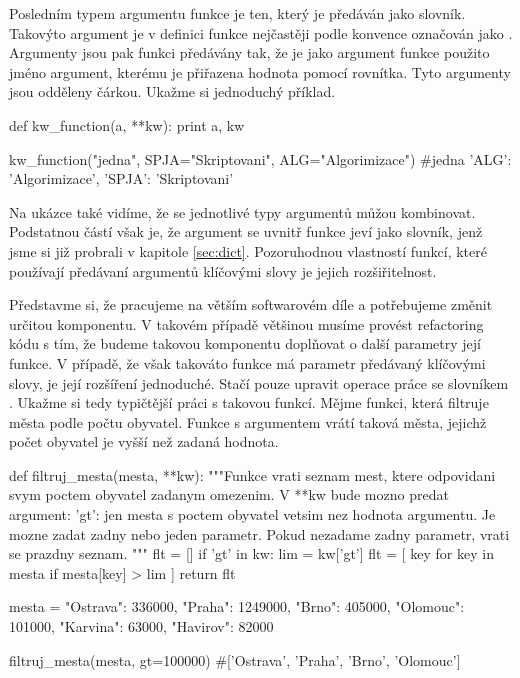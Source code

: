 Posledním typem argumentu funkce je ten, který je předáván jako slovník. Takovýto argument je
v definici funkce nejčastěji podle konvence označován jako . Argumenty jsou pak funkci
předávány tak, že je jako argument funkce použito jméno argument, kterému je přiřazena hodnota pomocí rovnítka.
Tyto argumenty jsou odděleny čárkou. Ukažme si jednoduchý příklad.

\begin{python}
def kw_function(a, **kw):
    print a, kw

kw_function("jedna", SPJA="Skriptovani", ALG="Algorimizace")
#jedna {'ALG': 'Algorimizace', 'SPJA': 'Skriptovani'}
\end{python}

Na ukázce také vidíme, že se jednotlivé typy argumentů můžou kombinovat. Podstatnou částí však je,
že argument  se uvnitř funkce jeví jako slovník, jenž jsme si již probrali v kapitole
\ref{sec:dict}. Pozoruhodnou vlastností funkcí, které používají předávaní argumentů klíčovými
slovy je jejich rozšiřitelnost.

Představme si, že pracujeme na větším softwarovém díle a potřebujeme změnit určitou
komponentu. V takovém případě většinou musíme provést refactoring kódu s tím, že budeme takovou
komponentu doplňovat o další parametry její funkce. V případě, že však takováto funkce má parametr
předávaný klíčovými slovy, je její rozšíření jednoduché. Stačí pouze upravit operace práce se
slovníkem . Ukažme si tedy typičtější práci s takovou funkcí. Mějme funkci, která filtruje
města podle počtu obyvatel. Funkce  s argumentem  vrátí taková města,
jejichž počet obyvatel je vyšší než zadaná hodnota.

\begin{python}
def filtruj_mesta(mesta, **kw):
    """Funkce vrati seznam mest, ktere odpovidani svym
    poctem obyvatel zadanym omezenim.
    V **kw bude mozno predat argument:
     'gt': jen mesta s poctem obyvatel vetsim nez hodnota
           argumentu.
    Je mozne zadat zadny nebo jeden parametr.
    Pokud nezadame zadny parametr, vrati se prazdny seznam.
    """
    flt = []
    if 'gt' in kw:
        lim = kw['gt']
        flt = [ key for key in mesta if mesta[key] > lim ]
    return flt

mesta = {"Ostrava": 336000, "Praha": 1249000,
         "Brno": 405000, "Olomouc": 101000,
         "Karvina": 63000, "Havirov": 82000}

filtruj_mesta(mesta, gt=100000)
#['Ostrava', 'Praha', 'Brno', 'Olomouc']
\end{python}

